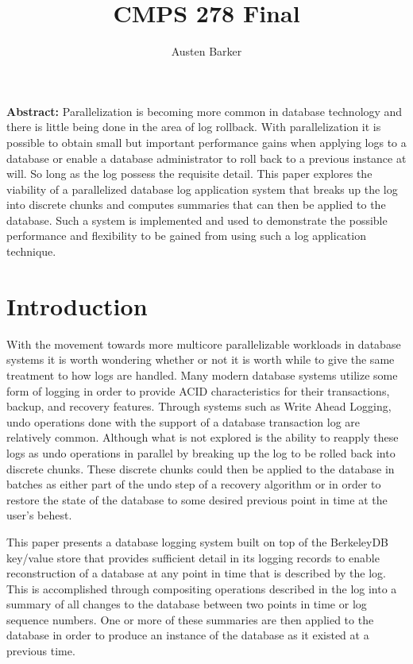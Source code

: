 \documentclass{article}
\begin{document}
\title{CMPS 278 Final}
\author{Austen Barker}
\maketitle


\textbf{Abstract:} 
Parallelization is becoming more common in database technology and there is little being done in the area of log rollback. With parallelization it is possible to obtain small but important performance gains when applying logs to a database or enable a database administrator to roll back to a previous instance at will. So long as the log possess the requisite detail. This paper explores the viability of a parallelized database log application system that breaks up the log into discrete chunks and computes summaries that can then be applied to the database. Such a system is implemented and used to demonstrate the possible performance and flexibility to be gained from using such a log application technique.

\section{Introduction}
With the movement towards more multicore parallelizable workloads in database systems it is worth wondering whether or not it is worth while to give the same treatment to how logs are handled. Many modern database systems utilize some form of logging in order to provide ACID characteristics for their transactions, backup, and recovery features. Through systems such as Write Ahead Logging, undo operations done with the support of a database transaction log are relatively common\cite{WAL}. Although what is not explored is the ability to reapply these logs as undo operations in parallel by breaking up the log to be rolled back into discrete chunks. These discrete chunks could then be applied to the database in batches as either part of the undo step of a recovery algorithm or in order to restore the state of the database to some desired previous point in time at the user's behest.

This paper presents a database logging system built on top of the BerkeleyDB key/value store that provides sufficient detail in its logging records to enable reconstruction of a database at any point in time that is described by the log. This is accomplished through compositing operations described in the log into a summary of all changes to the database between two points in time or log sequence numbers. One or more of these summaries are then applied to the database in order to produce an instance of the database as it existed at a previous time.
\end{document}
